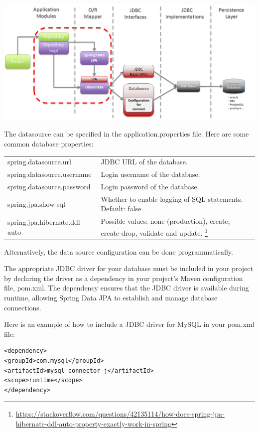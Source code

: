 \includegraphics[width=\textwidth]{./images/jpa/springdatajpa}

The datasource can be specified in the application.properties file.
Here are some common database properties:

\begin{tabular}{|l|p{8cm}|}
\hline
spring.datasource.url & JDBC URL of the database.\\
spring.datasource.username & Login username of the database.\\
spring.datasource.password & Login password of the database.\\
spring.jpa.show-sql & Whether to enable logging of SQL statements. Default: false\\
spring.jpa.hibernate.ddl-auto & Possible values: none (production), create, create-drop, validate and update. \footnote{\url{https://stackoverflow.com/questions/42135114/how-does-spring-jpa-hibernate-ddl-auto-property-exactly-work-in-spring}}\\
\hline
\end{tabular}

Alternatively, the data source configuration can be done programmatically.

The appropriate JDBC driver for your database must be included in your project by declaring the driver as a dependency in your project's Maven configuration file, pom.xml. The dependency ensures that the JDBC driver is available during runtime, allowing Spring Data JPA to establish and manage database connections.

Here is an example of how to include a JDBC driver for MySQL in your pom.xml file:

\begin{lstlisting}
<dependency>
<groupId>com.mysql</groupId>
<artifactId>mysql-connector-j</artifactId>
<scope>runtime</scope>
</dependency>
\end{lstlisting}


